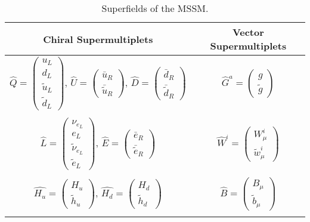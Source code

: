 \begin{table}[htb]\centering\begin{tabular}{cc}
{\bfseries Chiral Supermultiplets} & {\bfseries Vector Supermultiplets} \\ \midrule 
$\hat{Q} = \begin{pmatrix} u_{L} \\ d_{L}  \\ \tilde{u}_{L} \\ \tilde{d}_{L} \end{pmatrix}, \, \hat{U} = \begin{pmatrix} \bar{u}_{R} \\ \bar{\tilde{u}} _{R} \end{pmatrix}, \, \hat{D} = \begin{pmatrix} \bar d_{R}\\ \bar{\tilde{d}}_{R}  \end{pmatrix}$&
$\hat{G}^{a} = \begin{pmatrix} g\\ \tilde{g} \end{pmatrix}$
\\ \\
$\hat{L} = \begin{pmatrix} \nu_{e_{L}} \\ e_{L} \\ \tilde{\nu}_{e_{L}} \\ \tilde{e}_{L}  \end{pmatrix}, \, \hat{E} = \begin{pmatrix} \bar e_{R}\\ \bar{\tilde{e}}_{R}  \end{pmatrix}$ &
$\hat{W}^{i} = \begin{pmatrix} W_{\mu}^{i}\\ \tilde{w}_{\mu}^{i} \end{pmatrix}$
\\ \\
$\hat{H_{u}} = \begin{pmatrix} H_{u} \\ \tilde{h}_{u}  \end{pmatrix}, \,\hat{H_{d}} = \begin{pmatrix} H_{d} \\ \tilde{h}_{d}  \end{pmatrix}$&
$\hat{B} = \begin{pmatrix} B_{\mu}\\ \tilde{b}_{\mu} \end{pmatrix}$
\\ \\ \hline \hline
\end{tabular}\caption{Superfields of the MSSM.}\label{tab:supermultiplet} \end{table}

